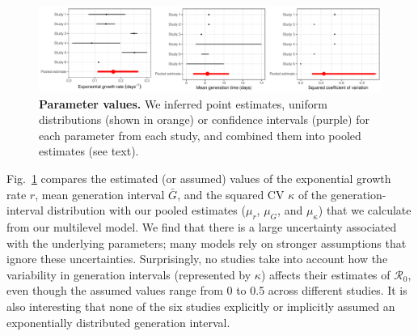 \documentclass[12pt]{article}
\newcommand{\fref}[1]{Fig.~\ref{fig:#1}}
\begin{document}
\begin{figure}[!ht]
\includegraphics[width=\textwidth]{compare_assumption.pdf}
\caption{
\textbf{Parameter values.}
We inferred point estimates, uniform distributions (shown in orange) or confidence intervals (purple) for each parameter from each study, and combined them into pooled estimates (see text).
}
\label{fig:assumption}
\end{figure}

\fref{assumption} compares the estimated (or assumed) values of the exponential growth rate $r$, mean generation interval $\bar G$, and the squared CV $\kappa$ of the generation-interval distribution with our pooled estimates ($\mu_r$, $\mu_G$, and $\mu_\kappa$) that we calculate from our multilevel model.
We find that there is a large uncertainty associated with the underlying parameters;
many models rely on stronger assumptions that ignore these uncertainties.
Surprisingly, no studies take into account how the variability in generation intervals (represented by $\kappa$) affects their estimates of $\mathcal R_0$, even though the assumed values range from 0 to 0.5 across different studies.
It is also interesting that none of the six studies explicitly or implicitly assumed an exponentially distributed generation interval.
\end{document}
